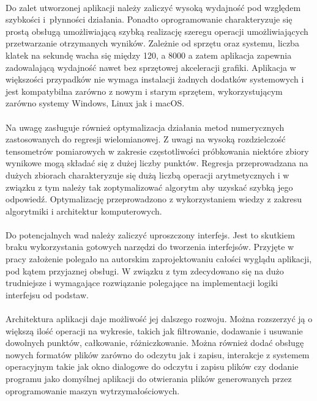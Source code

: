 \documentclass[12pt]{report}
\begin{document}
	\paragraph{}
	Do zalet utworzonej aplikacji należy zaliczyć wysoką wydajność pod względem szybkości i płynności działania. Ponadto oprogramowanie charakteryzuje się prostą obsługą umożliwiającą szybką realizację szeregu operacji umożliwiających przetwarzanie otrzymanych wyników. Zależnie od sprzętu oraz systemu, liczba klatek na sekundę wacha się między 120, a 8000 a zatem aplikacja zapewnia zadowalającą wydajność nawet bez sprzętowej akceleracji grafiki. Aplikacja w większości przypadków nie wymaga instalacji żadnych dodatków systemowych i jest kompatybilna zarówno z nowym i starym sprzętem, wykorzystującym zarówno systemy Windows, Linux jak i macOS.
	
	\paragraph{}
	Na uwagę zasługuje również optymalizacja działania metod numerycznych zastosowanych do regresji wielomianowej. Z uwagi na wysoką rozdzielczość tensometrów pomiarowych w zakresie częstotliwości próbkowania niektóre zbiory wynikowe mogą składać się z dużej liczby punktów. Regresja przeprowadzana na dużych zbiorach charakteryzuje się dużą liczbą operacji arytmetycznych i w związku z tym należy tak zoptymalizować algorytm aby uzyskać szybką jego odpowiedź. Optymalizację przeprowadzono z wykorzystaniem wiedzy z zakresu algorytmiki i architektur komputerowych.
	
	\paragraph{}
	Do potencjalnych wad należy zaliczyć uproszczony interfejs. Jest to skutkiem braku wykorzystania gotowych narzędzi do tworzenia interfejsów. Przyjęte w pracy założenie polegało na autorskim zaprojektowaniu całości wyglądu aplikacji, pod kątem przyjaznej obsługi. W związku z tym zdecydowano się na dużo trudniejsze i wymagające rozwiązanie polegające na implementacji logiki interfejsu od podstaw.
	
	\paragraph{}
	Architektura aplikacji daje możliwość jej dalszego rozwoju. Można rozszerzyć ją o większą ilość operacji na wykresie, takich jak filtrowanie, dodawanie i usuwanie dowolnych punktów, całkowanie, różniczkowanie. Można również dodać obsługę nowych formatów plików zarówno do odczytu jak i zapisu, interakcje z systemem operacyjnym takie jak okno dialogowe do odczytu i zapisu plików czy dodanie programu jako domyślnej aplikacji do otwierania plików generowanych przez oprogramowanie maszyn wytrzymałościowych.
	
\end{document}

